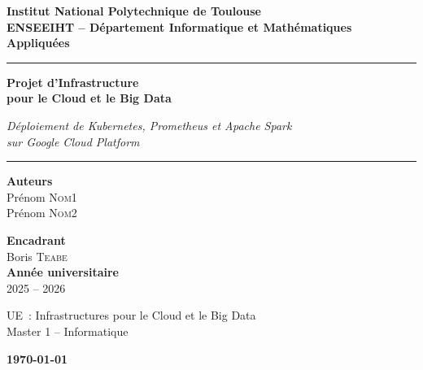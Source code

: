 \documentclass[12pt,a4paper,french]{report}
\begin{document}
\begin{titlepage}
  \centering
  \vspace*{1cm}
  
  {\Large\bfseries Institut National Polytechnique de Toulouse\\
  ENSEEIHT – Département Informatique et Mathématiques Appliquées}
  
  \vspace{0.5cm}
  \rule{\linewidth}{0.4pt}
  \vspace{1.5cm}
  
  {\Huge\bfseries Projet d'Infrastructure\\[0.3em]
  pour le Cloud et le Big Data}
  
  \vspace{0.8cm}
  
  {\Large\itshape Déploiement de Kubernetes, Prometheus et Apache Spark\\
  sur Google Cloud Platform}
  
  \vspace{1.5cm}
  \rule{\linewidth}{0.4pt}
  \vspace{1.5cm}
  
  \begin{minipage}{0.45\textwidth}
    \centering
    {\large\bfseries Auteurs}\\[0.4em]
    Prénom \textsc{Nom1}\\
    Prénom \textsc{Nom2}
  \end{minipage}
  \hfill
  \begin{minipage}{0.45\textwidth}
    \centering
    {\large\bfseries Encadrant}\\[0.4em]
    Boris \textsc{Teabe}\\[0.8em]
    {\large\bfseries Année universitaire}\\[0.4em]
    2025 -- 2026
  \end{minipage}
  
  \vfill
  {\large UE~: Infrastructures pour le Cloud et le Big Data\\
  Master 1 -- Informatique}
  
  \vspace{0.5cm}
  {\large\bfseries \today}
\end{titlepage}
\end{document}
